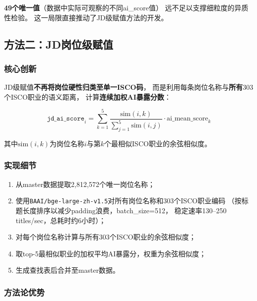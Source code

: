 \documentclass[12pt,a4paper]{ctexart}
\begin{document}
\begin{failbox}[ISCO级赋值的不足]
\textbf{49个唯一值}（数据中实际可观察的不同ai\_score值）
远不足以支撑细粒度的异质性检验。
这一局限直接推动了JD级赋值方法的开发。
\end{failbox}


\subsection{方法二：JD岗位级赋值}
\label{subsec:jd_scoring}

\subsubsection{核心创新}

JD级赋值\textbf{不再将岗位硬性归类至单一ISCO码}，
而是利用每条岗位名称与\textbf{所有}303个ISCO职业的语义距离，
计算\textbf{连续加权AI暴露分数}：

\[
\texttt{jd\_ai\_score}_i = \sum_{k=1}^{5} \frac{\text{sim}(i,k)}
{\sum_{j=1}^{5}\text{sim}(i,j)} \cdot \text{ai\_mean\_score}_k
\]

其中$\text{sim}(i,k)$为岗位名称$i$与第$k$个最相似ISCO职业的余弦相似度。

\subsubsection{实现细节}

\begin{enumerate}
\item 从master数据提取2,812,572个唯一岗位名称；
\item 使用\texttt{BAAI/bge-large-zh-v1.5}对所有岗位名称和303个ISCO职业编码
      （按标题长度排序以减少padding浪费，batch\_size=512，
      稳定速率130--250 titles/sec，总耗时约6小时）；
\item 对每个岗位名称计算与所有303个ISCO职业的余弦相似度；
\item 取top-5最相似职业的加权平均AI暴露分，权重为余弦相似度；
\item 生成查找表后合并至master数据。
\end{enumerate}

\subsubsection{方法论优势}
\end{document}
